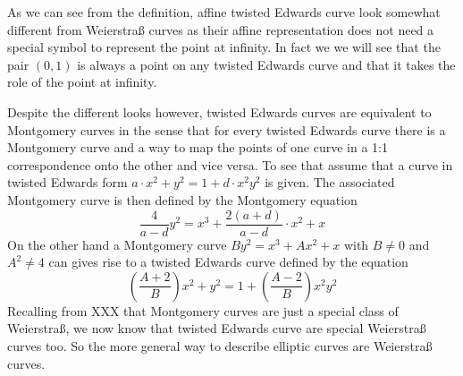 As we can see from the definition, affine twisted Edwards curve look somewhat different from Weierstraß curves as their affine representation does not need a special symbol to represent the point at infinity. In fact we we will see that the pair $(0,1)$ is always a point on any twisted Edwards curve and that it takes the role of the point at infinity.

Despite the different looks however, twisted Edwards curves are equivalent to Montgomery curves in the sense that for every twisted Edwards curve there is a Montgomery curve and a way to map the points of one curve in a 1:1 correspondence onto the other and vice versa. To see that assume that a curve in twisted Edwards form $a\cdot x^2+y^2= 1+d\cdot x^2y^2$ is given. The associated Montgomery curve is then defined by the Montgomery equation
\begin{equation}
\frac{4}{a-d} y^2 = x^3 + \frac{2(a+d)}{a-d}\cdot x^2 + x 
\end{equation}
On the other hand a Montgomery curve $By^{2}=x^{3}+Ax^{2}+x$ with $B\neq 0$ and $A^2\neq 4$ can gives rise to a twisted Edwards curve defined by the equation 
\begin{equation}
(\frac{A+2}{B})x^2+y^2= 1+(\frac{A-2}{B})x^2y^2
\end{equation}
Recalling from XXX that Montgomery curves are just a special class of Weierstraß, we now know that twisted Edwards curve are special Weierstraß curves too. So the more general way to describe elliptic curves are Weierstraß curves.
